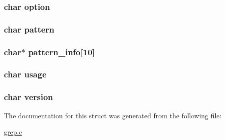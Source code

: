 \label{structparameter_a1381e4a8fe53b36d133973f26e08cef4}
\hypertarget{structparameter_a454fa9de3ca009e3082488412cd184d4}{
\subsubsection[{option}]{\setlength{\rightskip}{0pt plus 5cm}char {\bf option}}}
\label{structparameter_a454fa9de3ca009e3082488412cd184d4}
\hypertarget{structparameter_a021dce247495584ddd423f072f04672c}{
\subsubsection[{pattern}]{\setlength{\rightskip}{0pt plus 5cm}char {\bf pattern}}}
\label{structparameter_a021dce247495584ddd423f072f04672c}
\hypertarget{structparameter_a63ee2b43ba6b35b7de16d6d9da0b97e9}{
\subsubsection[{pattern\_\-info}]{\setlength{\rightskip}{0pt plus 5cm}char$\ast$ {\bf pattern\_\-info}\mbox{[}10\mbox{]}}}
\label{structparameter_a63ee2b43ba6b35b7de16d6d9da0b97e9}
\hypertarget{structparameter_a55fa74161839e8f2e73198c67ad074d7}{
\subsubsection[{usage}]{\setlength{\rightskip}{0pt plus 5cm}char {\bf usage}}}
\label{structparameter_a55fa74161839e8f2e73198c67ad074d7}
\hypertarget{structparameter_a1ae211b923c0ca2de98c2a6b3ec4c6b1}{
\subsubsection[{version}]{\setlength{\rightskip}{0pt plus 5cm}char {\bf version}}}
\label{structparameter_a1ae211b923c0ca2de98c2a6b3ec4c6b1}


The documentation for this struct was generated from the following file:\begin{DoxyCompactItemize}
\item 
\hyperlink{grep_8c}{grep.c}\end{DoxyCompactItemize}

